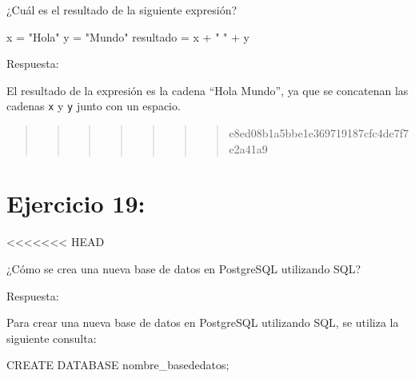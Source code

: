 \documentclass[
  a4paper,
  DIV=11,
  numbers=noendperiod,
  onepage,
  openany]{scrreprt}
\newenvironment{Shaded}{\begin{snugshade}}{\end{snugshade}}
\newcommand{\KeywordTok}[1]{\textcolor[rgb]{0.00,0.23,0.31}{#1}}
\newcommand{\NormalTok}[1]{\textcolor[rgb]{0.00,0.23,0.31}{#1}}
\newcommand{\OperatorTok}[1]{\textcolor[rgb]{0.37,0.37,0.37}{#1}}
\newcommand{\StringTok}[1]{\textcolor[rgb]{0.13,0.47,0.30}{#1}}
\begin{document}
¿Cuál es el resultado de la siguiente expresión?

\begin{Shaded}
\begin{Highlighting}[]
\NormalTok{x }\OperatorTok{=} \StringTok{"Hola"}
\NormalTok{y }\OperatorTok{=} \StringTok{"Mundo"}
\NormalTok{resultado }\OperatorTok{=}\NormalTok{ x }\OperatorTok{+} \StringTok{" "} \OperatorTok{+}\NormalTok{ y}
\end{Highlighting}
\end{Shaded}

Respuesta:

El resultado de la expresión es la cadena ``Hola Mundo'', ya que se
concatenan las cadenas \texttt{x} y \texttt{y} junto con un espacio.

\begin{quote}
\begin{quote}
\begin{quote}
\begin{quote}
\begin{quote}
\begin{quote}
\begin{quote}
e8ed08b1a5bbe1e369719187cfc4de7f7e2a41a9
\end{quote}
\end{quote}
\end{quote}
\end{quote}
\end{quote}
\end{quote}
\end{quote}

\hypertarget{ejercicio-19}{%
\chapter{Ejercicio 19:}\label{ejercicio-19}}

\textless\textless\textless\textless\textless\textless\textless{} HEAD

¿Cómo se crea una nueva base de datos en PostgreSQL utilizando SQL?

Respuesta:

Para crear una nueva base de datos en PostgreSQL utilizando SQL, se
utiliza la siguiente consulta:

\begin{Shaded}
\begin{Highlighting}[]
\KeywordTok{CREATE} \KeywordTok{DATABASE}\NormalTok{ nombre\_basededatos;}
\end{Highlighting}
\end{Shaded}
\end{document}
